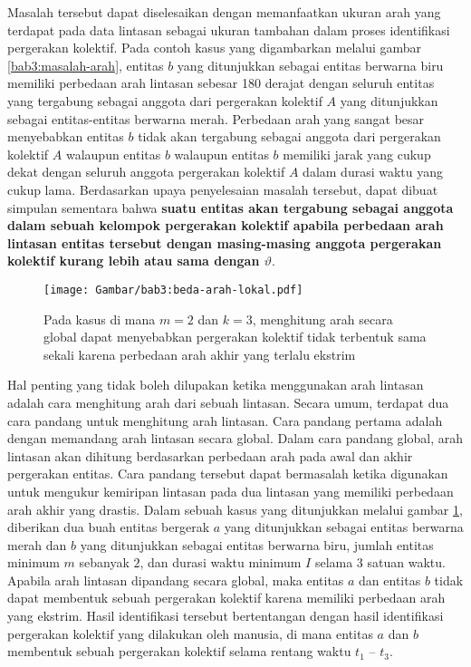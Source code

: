 Masalah tersebut dapat diselesaikan dengan memanfaatkan ukuran arah yang terdapat pada data lintasan sebagai ukuran tambahan dalam proses identifikasi pergerakan kolektif. Pada contoh kasus yang digambarkan melalui gambar \ref{bab3:masalah-arah}, entitas $b$ yang ditunjukkan sebagai entitas berwarna biru memiliki perbedaan arah lintasan sebesar 180 derajat dengan seluruh entitas yang tergabung sebagai anggota dari pergerakan kolektif $A$ yang ditunjukkan sebagai entitas-entitas berwarna merah. Perbedaan arah yang sangat besar menyebabkan entitas $b$ tidak akan tergabung sebagai anggota dari pergerakan kolektif $A$ walaupun entitas $b$ walaupun entitas $b$ memiliki jarak yang cukup dekat dengan seluruh anggota pergerakan kolektif $A$ dalam durasi waktu yang cukup lama. Berdasarkan upaya penyelesaian masalah tersebut, dapat dibuat simpulan sementara bahwa \textbf{suatu entitas akan tergabung sebagai anggota dalam sebuah kelompok pergerakan kolektif apabila perbedaan arah lintasan entitas tersebut dengan masing-masing anggota pergerakan kolektif kurang lebih atau sama dengan $\vartheta$}.

\begin{figure}
    \centering
    \texttt{[image: Gambar/bab3:beda-arah-lokal.pdf]}
    \caption{Pada kasus di mana $m = 2$ dan $k = 3$, menghitung arah secara global dapat menyebabkan pergerakan kolektif tidak terbentuk sama sekali karena perbedaan arah akhir yang terlalu ekstrim}
    \label{bab3:beda-arah-lokal}
\end{figure}

Hal penting yang tidak boleh dilupakan ketika menggunakan arah lintasan adalah cara menghitung arah dari sebuah lintasan. Secara umum, terdapat dua cara pandang untuk menghitung arah lintasan. Cara pandang pertama adalah dengan memandang arah lintasan secara global. Dalam cara pandang global, arah lintasan akan dihitung berdasarkan perbedaan arah pada awal dan akhir pergerakan entitas. Cara pandang tersebut dapat bermasalah ketika digunakan untuk mengukur kemiripan lintasan pada dua lintasan yang memiliki perbedaan arah akhir yang drastis. Dalam sebuah kasus yang ditunjukkan melalui gambar \ref{bab3:beda-arah-lokal}, diberikan dua buah entitas bergerak $a$ yang ditunjukkan sebagai entitas berwarna merah dan $b$ yang ditunjukkan sebagai entitas berwarna biru, jumlah entitas minimum $m$ sebanyak $2$, dan durasi waktu minimum $I$ selama $3$ satuan waktu. Apabila arah lintasan dipandang secara global, maka entitas $a$ dan entitas $b$ tidak dapat membentuk sebuah pergerakan kolektif karena memiliki perbedaan arah yang ekstrim. Hasil identifikasi tersebut bertentangan dengan hasil identifikasi pergerakan kolektif yang dilakukan oleh manusia, di mana entitas $a$ dan $b$ membentuk sebuah pergerakan kolektif selama rentang waktu $t_1$ -- $t_3$.

